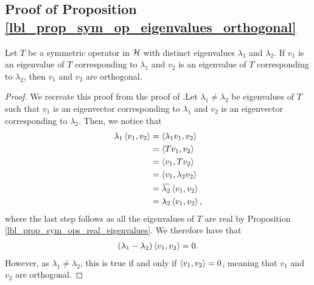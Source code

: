 \subsection{Proof of Proposition \eqref{lbl_prop_sym_op_eigenvalues_orthogonal}}\label{proof_lbl_prop_sym_op_eigenvalues_orthogonal}

\begin{proposition}
  Let $T$ be a symmetric operator in $\mathcal{H}$ with distinct eigenvalues $\lambda_1$ and $\lambda_2$. If $v_1$ is an eigenvalue of $T$ corresponding to $\lambda_1$ and $v_2$ is an eigenvalue of $T$ corresponding to $\lambda_2$, then $v_1$ and $v_2$ are orthogonal.
\end{proposition}
\begin{proof}
  We recreate this proof from the proof of {\cite[Chapter 41 Theorem 3]{glazman}}.Let $\lambda_1 \neq \lambda_2$ be eigenvalues of $T$ such that $v_1$ is an eigenvector corresponding to $\lambda_1$ and $v_2$ is an eigenvector corresponding to $\lambda_2$. Then, we notice that
  \begin{align*}
    \lambda_1 \ip{v_1, v_2}
    &=
    \ip{\lambda_1 v_1, v_2} \\
    &=
    \ip{Tv_1, v_2} \\
    &=
    \ip{v_1, Tv_2} \\
    &=
    \ip{v_1, \lambda_2 v_2} \\
    &=
    \conjugate{\lambda_2} \ip{v_1, v_2} \\
    &=
    \lambda_2 \ip{v_1, v_2},
  \end{align*}
  where the last step follows as all the eigenvalues of $T$ are real by Proposition \eqref{lbl_prop_sym_ops_real_eigenvalues}. We therefore have that
  \begin{align*}
    (\lambda_1 - \lambda_2) \left\langle v_1, v_2\right\rangle = 0.
  \end{align*}
  However, as $\lambda_1 \neq \lambda_2$, this is true if and only if $\left\langle v_1, v_2\right\rangle = 0$, meaning that $v_1$ and $v_2$ are orthogonal.
\end{proof}
